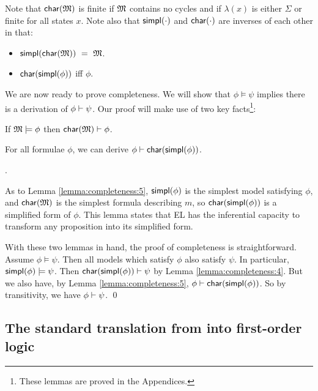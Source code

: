 \NI Note that $\mathsf{char}(\frak{M})$ is finite if $\frak{M}$ contains no cycles and if
$\lambda(x)$ is either $\Sigma$ or finite for all states $x$.
Note also that $\mathsf{simpl}(\cdot)$ and $\mathsf{char}(\cdot)$ are inverses of each other in that:

\begin{itemize}

\item $\mathsf{simpl}(\mathsf{char}(\frak{M})) \ = \  \frak{M}$. 

\item $\mathsf{char}(\mathsf{simpl}(\phi))$ iff $\phi$.

\end{itemize}

\NI We are now ready to prove completeness.  We will show that $\phi
\models \psi$ implies there is a derivation of $\phi \vdash \psi$.  Our proof
will make use of two key facts\footnote{These lemmas are proved in the Appendices.}:

\begin{lemma}\label{lemma:completeness:4}
If $\frak{M} \models \phi$ then $\mathsf{char}(\frak{M}) \vdash \phi$.
\end{lemma}

\begin{lemma}\label{lemma:completeness:5}
For all formulae $\phi$, we can derive $\phi \vdash \mathsf{char}(\mathsf{simpl}(\phi))$.
\end{lemma}

.

As to Lemma \ref{lemma:completeness:5}, $\mathsf{simpl}(\phi)$ is the simplest model
satisfying $\phi$, and $\mathsf{char}(\frak{M})$ is the simplest formula describing
$m$, so $\mathsf{char}(\mathsf{simpl}(\phi))$ is a simplified form of $\phi$. This lemma
states that EL has the inferential capacity to transform any
proposition into its simplified form.

With these two lemmas in hand, the proof of completeness is
straightforward.  Assume $\phi \models \psi$.  Then all models which satisfy
$\phi$ also satisfy $\psi$.  In particular, $\mathsf{simpl}(\phi) \models \psi$.  Then
$\mathsf{char}(\mathsf{simpl}(\phi)) \vdash \psi$ by Lemma \ref{lemma:completeness:4}.  But we
also have, by Lemma \ref{lemma:completeness:5}, $\phi \vdash
\mathsf{char}(\mathsf{simpl}(\phi)) $.  So by transitivity, we have $\phi \vdash \psi$.  \qed


\subsection{The standard translation from  \ELABR{} into 
            first-order logic}\label{standardTranslation}

